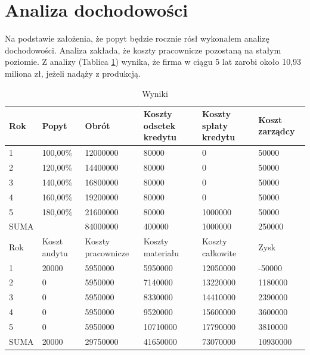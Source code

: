 \documentclass[a4paper]{article}
\begin{document}
\section{Analiza dochodowości}
Na podstawie założenia, że popyt będzie rocznie rósł wykonałem analizę dochodowości. Analiza zakłada, że koszty pracownicze pozostaną na stałym poziomie. Z analizy (Tablica \ref{tab:1}) wynika, że firma w ciągu 5 lat zarobi około 10,93 miliona zł, jeżeli nadąży z produkcją.
\begin{table}
\centering
\begin{tabular}{|l|l|l|l|l|l|}
\hline
Rok  & Popyt        & Obrót              & Koszty odsetek kredytu & Koszty spłaty kredytu & Koszt zarządcy \\ \hline
1    & 100,00\%     & 12000000           & 80000                  & 0                     & 50000          \\ \hline
2    & 120,00\%     & 14400000           & 80000                  & 0                     & 50000          \\ \hline
3    & 140,00\%     & 16800000           & 80000                  & 0                     & 50000          \\ \hline
4    & 160,00\%     & 19200000           & 80000                  & 0                     & 50000          \\ \hline
5    & 180,00\%     & 21600000           & 80000                  & 1000000               & 50000          \\ \hline
SUMA &              & 84000000           & 400000                 & 1000000               & 250000         \\ \hline
Rok  & Koszt audytu & Koszty pracownicze & Koszty materiału       & Koszty całkowite      & Zysk           \\ \hline
1    & 20000        & 5950000            & 5950000                & 12050000              & -50000         \\ \hline
2    & 0            & 5950000            & 7140000                & 13220000              & 1180000        \\ \hline
3    & 0            & 5950000            & 8330000                & 14410000              & 2390000        \\ \hline
4    & 0            & 5950000            & 9520000                & 15600000              & 3600000        \\ \hline
5    & 0            & 5950000            & 10710000               & 17790000              & 3810000        \\ \hline
SUMA & 20000        & 29750000           & 41650000               & 73070000              & 10930000       \\ \hline
\end{tabular}
\caption{Wyniki}
\label{tab:1}
\end{table}
\end{document}
